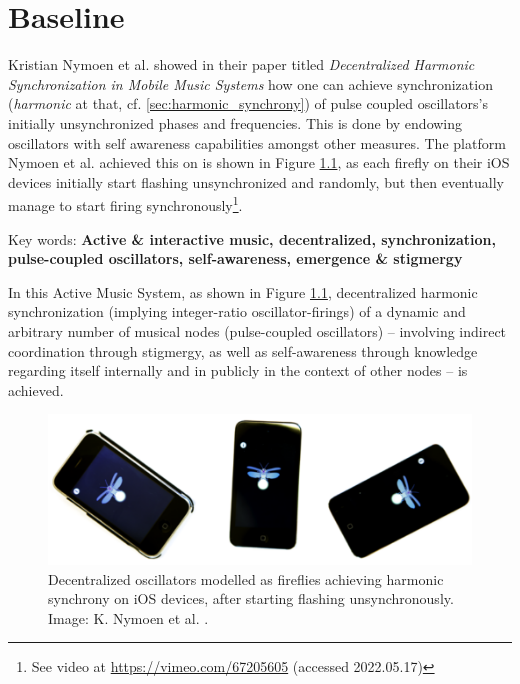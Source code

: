 \chapter{Baseline}
\label{chap:baseline}






Kristian Nymoen et al. showed in their paper titled \textit{Decentralized Harmonic Synchronization in Mobile Music Systems} \cite{nymoen_synch} how one can achieve synchronization (\textit{harmonic} at that, cf. \ref{sec:harmonic_synchrony}) of pulse coupled oscillators's initially unsynchronized phases and frequencies. This is done by endowing oscillators with self awareness capabilities amongst other measures. The platform Nymoen et al. achieved this on is shown in Figure \ref{fig:nymoen_fireflies_on_ios_devices}, as each firefly on their iOS devices initially start flashing unsynchronized and randomly, but then eventually manage to start firing synchronously\footnote{See video at \url{https://vimeo.com/67205605} (accessed 2022.05.17)}.

Key words: \textbf{Active \& interactive music, decentralized, synchronization, pulse-coupled oscillators, self-awareness, emergence \& stigmergy}
\newline

In this Active Music System, as shown in Figure \ref{fig:nymoen_fireflies_on_ios_devices}, decentralized harmonic synchronization (implying integer-ratio oscillator-firings) of a dynamic and arbitrary number of musical nodes (pulse-coupled oscillators) -- involving indirect coordination through stigmergy, as well as self-awareness through knowledge regarding itself internally and in publicly in the context of other nodes -- is achieved.
\newline

\begin{figure}[ht!]
	\centering
	\includegraphics[width=0.7\linewidth]{Assets/DocSegments/Chapters/Baseline/Figures/Illustrations/fireflies_on_ios_devices.png}
	\caption[]{Decentralized oscillators modelled as fireflies achieving harmonic synchrony on iOS devices, after starting flashing unsynchronously. Image: K. Nymoen et al. \cite{nymoen_synch}.}
	\label{fig:nymoen_fireflies_on_ios_devices}
\end{figure}

